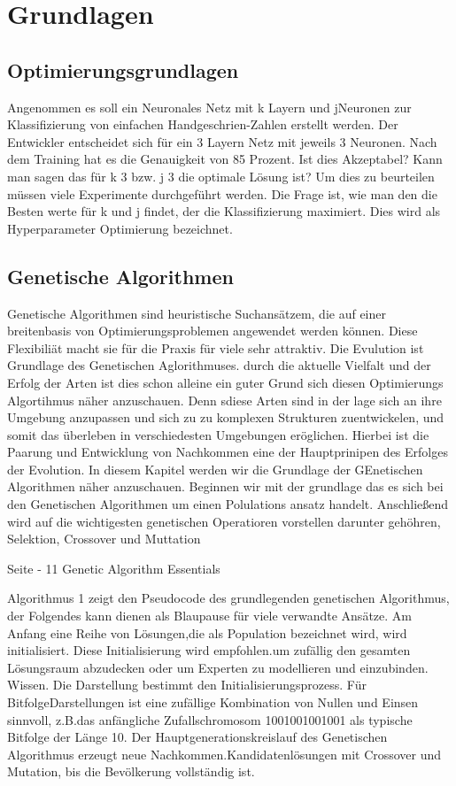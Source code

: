 
\section{Grundlagen}
\label{sec:Grundlagen}


\subsection{Optimierungsgrundlagen}
Angenommen es soll ein Neuronales Netz mit k Layern und jNeuronen zur Klassifizierung von einfachen Handgeschrien-Zahlen erstellt werden. Der Entwickler entscheidet sich für ein 3 Layern Netz mit jeweils 3 Neuronen. Nach dem Training hat es die Genauigkeit von 85 Prozent. Ist dies Akzeptabel? Kann man sagen das für k 3 bzw. j 3 die optimale Lösung ist? Um dies zu beurteilen müssen viele Experimente durchgeführt werden. Die Frage ist, wie man den die Besten werte für k und j findet, der die Klassifizierung maximiert. Dies wird als Hyperparameter Optimierung bezeichnet. 

\subsection{Genetische Algorithmen}
Genetische Algorithmen sind heuristische Suchansätzem, die auf einer breitenbasis von Optimierungsproblemen angewendet werden können. Diese Flexibiliät macht sie für die Praxis für viele sehr attraktiv. Die Evulution ist Grundlage des Genetischen Aglorithmuses. durch die aktuelle Vielfalt und der Erfolg der Arten ist dies schon alleine ein guter Grund sich diesen Optimierungs Algortihmus näher anzuschauen. Denn sdiese Arten sind in der lage sich an ihre Umgebung anzupassen und sich zu zu komplexen Strukturen zuentwickelen, und somit das überleben in verschiedesten Umgebungen eröglichen. Hierbei ist die Paarung und Entwicklung von Nachkommen eine der Hauptprinipen des Erfolges der Evolution. In diesem Kapitel werden wir die Grundlage der GEnetischen Algorithmen näher anzuschauen. Beginnen wir mit der grundlage das es sich bei den Genetischen Algorithmen um einen Polulations ansatz handelt. Anschließend wird auf die wichtigesten genetischen Operatioren vorstellen darunter gehöhren, Selektion, Crossover und Muttation

Seite - 11 Genetic Algorithm Essentials


\iffalse
Algorithmus 1 zeigt den Pseudocode des grundlegenden genetischen Algorithmus, der Folgendes kann
dienen als Blaupause für viele verwandte Ansätze. Am Anfang eine Reihe von Lösungen,die als Population bezeichnet wird, wird initialisiert. Diese Initialisierung wird empfohlen.um zufällig den gesamten Lösungsraum abzudecken oder um Experten zu modellieren und einzubinden.
Wissen. Die Darstellung bestimmt den Initialisierungsprozess. Für BitfolgeDarstellungen ist eine zufällige Kombination von Nullen und Einsen sinnvoll, z.B.das anfängliche Zufallschromosom 1001001001001 als typische Bitfolge der Länge 10. Der Hauptgenerationskreislauf des Genetischen Algorithmus erzeugt neue Nachkommen.Kandidatenlösungen mit Crossover und Mutation, bis die Bevölkerung vollständig ist.


